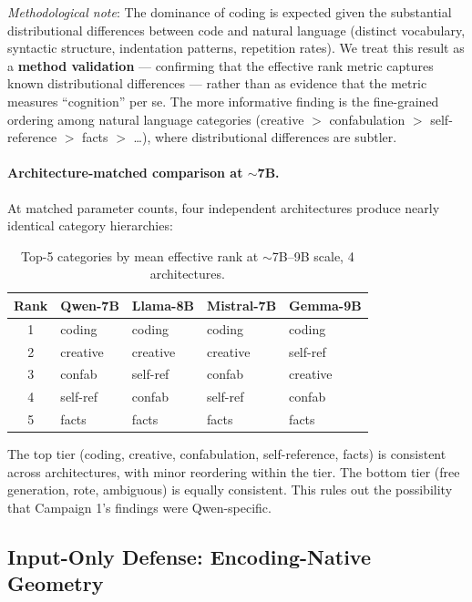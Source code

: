 \documentclass[11pt,a4paper]{article}
\begin{document}
\emph{Methodological note}: The dominance of coding is expected given the substantial distributional differences between code and natural language (distinct vocabulary, syntactic structure, indentation patterns, repetition rates). We treat this result as a \textbf{method validation} --- confirming that the effective rank metric captures known distributional differences --- rather than as evidence that the metric measures ``cognition'' per se. The more informative finding is the fine-grained ordering among natural language categories (creative $>$ confabulation $>$ self-reference $>$ facts $>$ \ldots), where distributional differences are subtler.

\paragraph{Architecture-matched comparison at $\sim$7B.} At matched parameter counts, four independent architectures produce nearly identical category hierarchies:

\begin{table}[H]
\centering
\caption{Top-5 categories by mean effective rank at $\sim$7B--9B scale, 4 architectures.}
\label{tab:cross_arch_7b}
\begin{tabular}{cllll}
\toprule
\textbf{Rank} & \textbf{Qwen-7B} & \textbf{Llama-8B} & \textbf{Mistral-7B} & \textbf{Gemma-9B} \\
\midrule
1 & coding & coding & coding & coding \\
2 & creative & creative & creative & self-ref \\
3 & confab & self-ref & confab & creative \\
4 & self-ref & confab & self-ref & confab \\
5 & facts & facts & facts & facts \\
\bottomrule
\end{tabular}
\end{table}

The top tier (coding, creative, confabulation, self-reference, facts) is consistent across architectures, with minor reordering within the tier. The bottom tier (free generation, rote, ambiguous) is equally consistent. This rules out the possibility that Campaign 1's findings were Qwen-specific.

\subsection{Input-Only Defense: Encoding-Native Geometry}
\label{sec:input_only}
\end{document}
